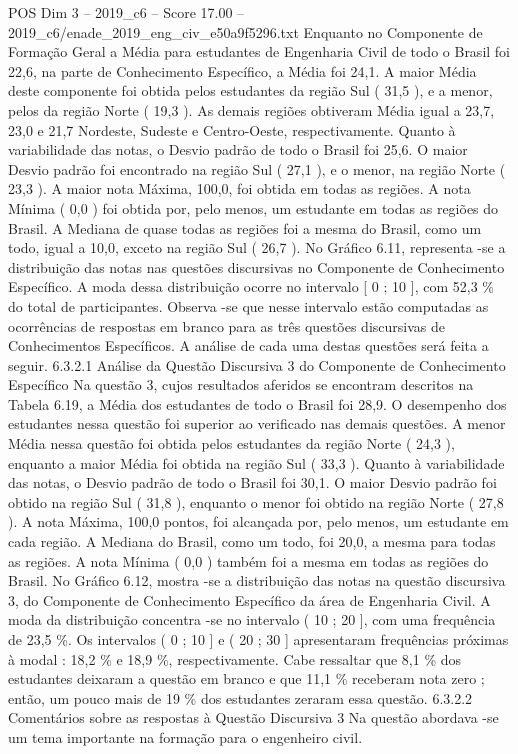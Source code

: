 \begin{textsample}{POS Dim 3 – 2019\_c6 – Score 17.00 – 2019\_c6/enade\_2019\_eng\_civ\_e50a9f5296.txt}
Enquanto no Componente de Formação Geral a Média para estudantes de Engenharia Civil de todo o Brasil foi 22,6, na parte de Conhecimento Específico, a Média foi 24,1.
A maior Média deste componente foi obtida pelos estudantes da região Sul ( 31,5 ), e a menor, pelos da região Norte ( 19,3 ).
As demais regiões obtiveram Média igual a 23,7, 23,0 e 21,7 Nordeste, Sudeste e Centro-Oeste, respectivamente.
Quanto à variabilidade das notas, o Desvio padrão de todo o Brasil foi 25,6.
O maior Desvio padrão foi encontrado na região Sul ( 27,1 ), e o menor, na região Norte ( 23,3 ).
A maior nota Máxima, 100,0, foi obtida em todas as regiões.
A nota Mínima ( 0,0 ) foi obtida por, pelo menos, um estudante em todas as regiões do Brasil.
A Mediana de quase todas as regiões foi a mesma do Brasil, como um todo, igual a 10,0, exceto na região Sul ( 26,7 ).
No Gráfico 6.11, representa -se a distribuição das notas nas questões discursivas no Componente de Conhecimento Específico.
A moda dessa distribuição ocorre no intervalo [ 0 ; 10 ], com 52,3 \% do total de participantes.
Observa -se que nesse intervalo estão computadas as ocorrências de respostas em branco para as três questões discursivas de Conhecimentos Específicos.
A análise de cada uma destas questões será feita a seguir. 6.3.2.1 Análise da Questão Discursiva 3 do Componente de Conhecimento Específico Na questão 3, cujos resultados aferidos se encontram descritos na Tabela 6.19, a Média dos estudantes de todo o Brasil foi 28,9.
O desempenho dos estudantes nessa questão foi superior ao verificado nas demais questões.
A menor Média nessa questão foi obtida pelos estudantes da região Norte ( 24,3 ), enquanto a maior Média foi obtida na região Sul ( 33,3 ).
Quanto à variabilidade das notas, o Desvio padrão de todo o Brasil foi 30,1.
O maior Desvio padrão foi obtido na região Sul ( 31,8 ), enquanto o menor foi obtido na região Norte ( 27,8 ).
A nota Máxima, 100,0 pontos, foi alcançada por, pelo menos, um estudante em cada região.
A Mediana do Brasil, como um todo, foi 20,0, a mesma para todas as regiões.
A nota Mínima ( 0,0 ) também foi a mesma em todas as regiões do Brasil.
No Gráfico 6.12, mostra -se a distribuição das notas na questão discursiva 3, do Componente de Conhecimento Específico da área de Engenharia Civil.
A moda da distribuição concentra -se no intervalo ( 10 ; 20 ], com uma frequência de 23,5 \%.
Os intervalos ( 0 ; 10 ] e ( 20 ; 30 ] apresentaram frequências próximas à modal : 18,2 \% e 18,9 \%, respectivamente.
Cabe ressaltar que 8,1 \% dos estudantes deixaram a questão em branco e que 11,1 \% receberam nota zero ; então, um pouco mais de 19 \% dos estudantes zeraram essa questão. 6.3.2.2 Comentários sobre as respostas à Questão Discursiva 3 Na questão abordava -se um tema importante na formação para o engenheiro civil.

\end{textsample}

